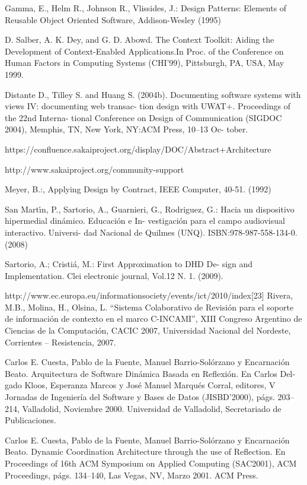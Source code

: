 \begin{thebibliography}{1}
{
Gamma, E., Helm R., Johnson R., Vlissides, J.: Design
Patterns: Elements of Reusable Object Oriented Software,
Addison-Wesley (1995)

D. Salber, A. K. Dey, and G. D. Abowd. The Context Toolkit:
Aiding the Development of Context-Enabled Applications.In
Proc. of the Conference on Human Factors in Computing
Systems (CHI’99), Pittsburgh, PA, USA, May 1999.

Distante D., Tilley S. and Huang S. (2004b). Documenting
software systems with views IV: documenting web transac-
tion design with UWAT+. Proceedings of the 22nd Interna-
tional Conference on Design of Communication (SIGDOC
2004), Memphis, TN, New York, NY:ACM Press, 10–13 Oc-
tober.

https://confluence.sakaiproject.org/display/DOC/Abstract+Architecture

http://www.sakaiproject.org/community-support

Meyer, B.:, Applying Design by Contract, IEEE Computer,
40-51. (1992)

San Martı́n, P., Sartorio, A., Guarnieri, G., Rodriguez, G.:
Hacia un dispositivo hipermedial dinámico. Educación e In-
vestigación para el campo audiovisual interactivo. Universi-
dad Nacional de Quilmes (UNQ). ISBN:978-987-558-134-0.
(2008)

Sartorio, A.; Cristiá, M.: First Approximation to DHD De-
sign and Implementation. Clei electronic journal, Vol.12 N.
1. (2009).

http://www.ec.europa.eu/informationsociety/events/ict/2010/index[23] Rivera, M.B., Molina, H., Olsina, L. “Sistema Colaborativo
de Revisión para el soporte de información de contexto en
el marco C-INCAMI”, XIII Congreso Argentino de Ciencias
de la Computación, CACIC 2007, Universidad Nacional del
Nordeste, Corrientes – Resistencia, 2007.


Carlos E. Cuesta, Pablo de la Fuente, Manuel Barrio-Solórzano y Encarnación
Beato. Arquitectura de Software Dinámica Basada en Reflexión. En Carlos Del-
gado Kloos, Esperanza Marcos y José Manuel Marqués Corral, editores, V Jornadas de Ingeniería del Software y Bases de Datos (JISBD’2000), págs. 203–214,
Valladolid, Noviembre 2000. Universidad de Valladolid, Secretariado de Publicaciones.

Carlos E. Cuesta, Pablo de la Fuente, Manuel Barrio-Solórzano y Encarnación
Beato. Dynamic Coordination Architecture through the use of Reflection. En
Proceedings of 16th ACM Symposium on Applied Computing (SAC2001), ACM Proceedings, págs. 134–140, Las Vegas, NV, Marzo 2001. ACM Press.

}
\end{thebibliography}
